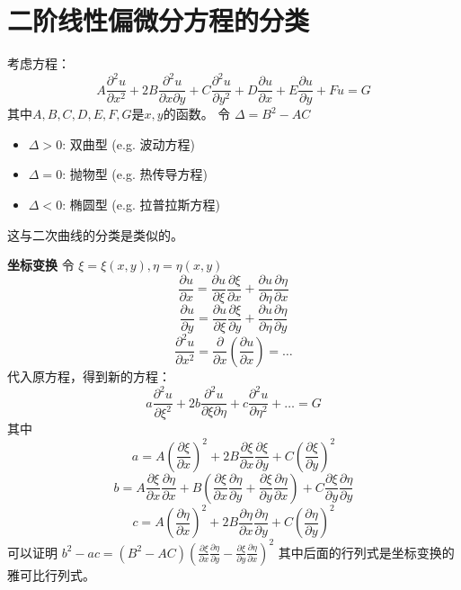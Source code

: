 \documentclass{article}
\begin{document}
	\section*{二阶线性偏微分方程的分类}
	考虑方程：
	$$ 
	A \frac{\partial^2 u}{\partial x^2} + 2B \frac{\partial^2 u}{\partial x \partial y} + C \frac{\partial^2 u}{\partial y^2} + D \frac{\partial u}{\partial x} + E \frac{\partial u}{\partial y} + F u = G 
	$$
	其中$A, B, C, D, E, F, G$是$x, y$的函数。
	令 $\Delta = B^2 - AC$
	\begin{itemize}
		\item $\Delta > 0$: 双曲型 (e.g. 波动方程)
		\item $\Delta = 0$: 抛物型 (e.g. 热传导方程)
		\item $\Delta < 0$: 椭圆型 (e.g. 拉普拉斯方程)
	\end{itemize}
	这与二次曲线的分类是类似的。
	
	\textbf{坐标变换}
	令 $\xi = \xi(x,y), \eta = \eta(x,y)$
	$$ \frac{\partial u}{\partial x} = \frac{\partial u}{\partial \xi} \frac{\partial \xi}{\partial x} + \frac{\partial u}{\partial \eta} \frac{\partial \eta}{\partial x} $$
	$$ \frac{\partial u}{\partial y} = \frac{\partial u}{\partial \xi} \frac{\partial \xi}{\partial y} + \frac{\partial u}{\partial \eta} \frac{\partial \eta}{\partial y} $$
	$$ \frac{\partial^2 u}{\partial x^2} = \frac{\partial}{\partial x} (\frac{\partial u}{\partial x}) = \dots $$
	代入原方程，得到新的方程：
	$$ 
	a \frac{\partial^2 u}{\partial \xi^2} + 2b \frac{\partial^2 u}{\partial \xi \partial \eta} + c \frac{\partial^2 u}{\partial \eta^2} + \dots = G 
	$$
	其中
	$$ a = A(\frac{\partial \xi}{\partial x})^2 + 2B \frac{\partial \xi}{\partial x} \frac{\partial \xi}{\partial y} + C(\frac{\partial \xi}{\partial y})^2 $$
	$$ b = A \frac{\partial \xi}{\partial x} \frac{\partial \eta}{\partial x} + B (\frac{\partial \xi}{\partial x} \frac{\partial \eta}{\partial y} + \frac{\partial \xi}{\partial y} \frac{\partial \eta}{\partial x}) + C \frac{\partial \xi}{\partial y} \frac{\partial \eta}{\partial y} $$
	$$ c = A(\frac{\partial \eta}{\partial x})^2 + 2B \frac{\partial \eta}{\partial x} \frac{\partial \eta}{\partial y} + C(\frac{\partial \eta}{\partial y})^2 $$
	可以证明 $b^2 - ac = (B^2 - AC) (\frac{\partial \xi}{\partial x} \frac{\partial \eta}{\partial y} - \frac{\partial \xi}{\partial y} \frac{\partial \eta}{\partial x})^2$
	其中后面的行列式是坐标变换的雅可比行列式。
	
\end{document}
